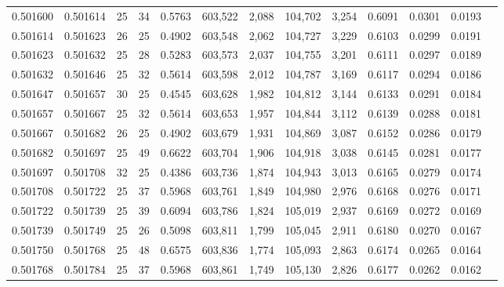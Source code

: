 \begin{tabular}{rrrrrrrrrrrrr}
0.501600 & 0.501614 &    25 &  34 &                                     0.5763 & 603,522 &   2,088 & 104,702 &   3,254 & 0.6091 & 0.0301 & 0.0193 \\
0.501614 & 0.501623 &    26 &  25 &                                     0.4902 & 603,548 &   2,062 & 104,727 &   3,229 & 0.6103 & 0.0299 & 0.0191 \\
0.501623 & 0.501632 &    25 &  28 &                                     0.5283 & 603,573 &   2,037 & 104,755 &   3,201 & 0.6111 & 0.0297 & 0.0189 \\
0.501632 & 0.501646 &    25 &  32 &                                     0.5614 & 603,598 &   2,012 & 104,787 &   3,169 & 0.6117 & 0.0294 & 0.0186 \\
0.501647 & 0.501657 &    30 &  25 &                                     0.4545 & 603,628 &   1,982 & 104,812 &   3,144 & 0.6133 & 0.0291 & 0.0184 \\
0.501657 & 0.501667 &    25 &  32 &                                     0.5614 & 603,653 &   1,957 & 104,844 &   3,112 & 0.6139 & 0.0288 & 0.0181 \\
0.501667 & 0.501682 &    26 &  25 &                                     0.4902 & 603,679 &   1,931 & 104,869 &   3,087 & 0.6152 & 0.0286 & 0.0179 \\
0.501682 & 0.501697 &    25 &  49 &                                     0.6622 & 603,704 &   1,906 & 104,918 &   3,038 & 0.6145 & 0.0281 & 0.0177 \\
0.501697 & 0.501708 &    32 &  25 &                                     0.4386 & 603,736 &   1,874 & 104,943 &   3,013 & 0.6165 & 0.0279 & 0.0174 \\
0.501708 & 0.501722 &    25 &  37 &                                     0.5968 & 603,761 &   1,849 & 104,980 &   2,976 & 0.6168 & 0.0276 & 0.0171 \\
0.501722 & 0.501739 &    25 &  39 &                                     0.6094 & 603,786 &   1,824 & 105,019 &   2,937 & 0.6169 & 0.0272 & 0.0169 \\
0.501739 & 0.501749 &    25 &  26 &                                     0.5098 & 603,811 &   1,799 & 105,045 &   2,911 & 0.6180 & 0.0270 & 0.0167 \\
0.501750 & 0.501768 &    25 &  48 &                                     0.6575 & 603,836 &   1,774 & 105,093 &   2,863 & 0.6174 & 0.0265 & 0.0164 \\
0.501768 & 0.501784 &    25 &  37 &                                     0.5968 & 603,861 &   1,749 & 105,130 &   2,826 & 0.6177 & 0.0262 & 0.0162 \\

\end{tabular}
